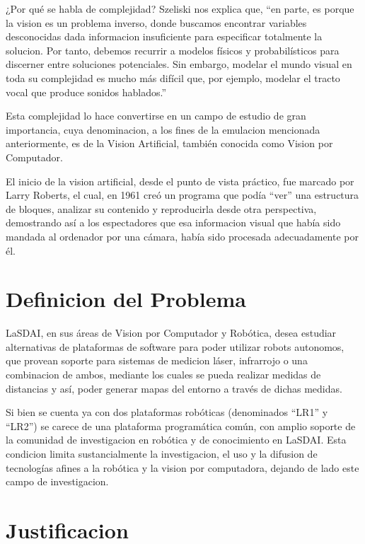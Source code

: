 ¿Por qué se habla de complejidad? Szeliski nos explica que, ``en parte, es porque la vision es un problema inverso, donde buscamos encontrar variables desconocidas dada informacion insuficiente para especificar totalmente la solucion. Por tanto, debemos recurrir a modelos físicos y probabilísticos para discerner entre soluciones potenciales. Sin embargo, modelar el mundo visual en toda su complejidad es mucho más difícil que, por ejemplo, modelar el tracto vocal que produce sonidos hablados.'' \citep{RS:09}

Esta complejidad lo hace convertirse en un campo de estudio de gran importancia, cuya denominacion, a los fines de la
emulacion mencionada anteriormente, es de la Vision Artificial, también conocida como Vision por Computador.

El inicio de la vision artificial, desde el punto de vista práctico, fue marcado por Larry Roberts, el cual, en 1961 creó un programa que podía ``ver'' una estructura de bloques, analizar su contenido y reproducirla desde otra perspectiva, demostrando así a los espectadores que esa informacion visual que había sido mandada al ordenador por una cámara, había sido procesada adecuadamente por él. \citep{bb68865}

\section{Definicion del Problema}

LaSDAI, en sus áreas de Vision por Computador y Robótica, desea estudiar alternativas de plataformas de software para poder utilizar robots autonomos, que provean soporte para sistemas de medicion láser, infrarrojo o una combinacion de ambos, mediante los cuales se pueda realizar medidas de distancias y así, poder generar mapas del entorno a través de dichas medidas.

Si bien se cuenta ya con dos plataformas robóticas (denominados ``LR1'' y ``LR2'') se carece de una plataforma programática común, con amplio soporte de la comunidad de investigacion en robótica y de conocimiento en LaSDAI\@. Esta condicion limita sustancialmente la investigacion, el uso y la difusion de tecnologías afines a la robótica y la vision por computadora, dejando de lado este campo de investigacion.

\section{Justificacion}

